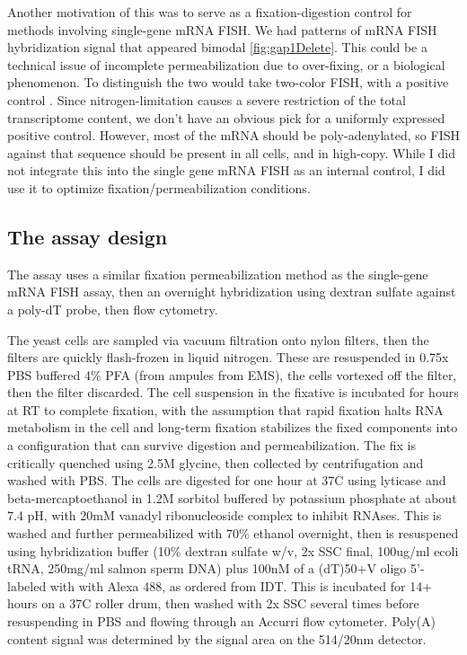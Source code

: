 Another motivation of this was to serve as a fixation-digestion
control for methods involving single-gene mRNA FISH.
We had patterns of mRNA FISH hybridization signal that appeared
bimodal \autoref{fig:gap1Delete}. 
This could be a technical issue of incomplete permeabilization due to
over-fixing, or a biological phenomenon.
To distinguish the two would take two-color FISH, with a positive
control \parencite{andersen2014genetic}.
Since nitrogen-limitation causes a severe restriction of the total
transcriptome content, we don't have an obvious pick for a uniformly
expressed positive control. 
However, most of the mRNA should be poly-adenylated, so FISH against
that sequence should be present in all cells, and in high-copy.
While I did not integrate this into the single gene mRNA FISH as an
internal control, I did use it to optimize fixation/permeabilization 
conditions.

%
%
%
\subsection{The assay design}
%
%
%

The assay uses a similar fixation permeabilization method as the
single-gene mRNA FISH assay, then an overnight hybridization using
dextran sulfate against a poly-dT probe, then flow cytometry.

The yeast cells are sampled via vacuum filtration onto nylon
filters, then the filters are quickly flash-frozen in liquid nitrogen.
These are resuspended in 0.75x PBS buffered 4\% PFA (from ampules from
EMS), the cells vortexed off the filter, then the filter discarded.
The cell suspension in the fixative is incubated for hours at RT to
complete fixation, with the assumption that rapid fixation halts
RNA metabolism in the cell and long-term fixation stabilizes the fixed
components into a configuration that can survive digestion and 
permeabilization. The fix is critically quenched using 2.5M glycine,
then collected by centrifugation and washed with PBS. The cells are
digested for one hour at 37C using lyticase and beta-mercaptoethanol
in 1.2M sorbitol buffered
by potassium phosphate at about 7.4 pH, with 20mM vanadyl
ribonucleoside complex to inhibit RNAses. 
This is washed and further permeabilized with 70\% ethanol overnight,
then is resuspened using hybridization buffer
(10\% dextran sulfate w/v, 2x SSC final, 100ug/ml ecoli tRNA, 
250mg/ml salmon sperm DNA) plus 100nM of a (dT)50+V oligo 5'-labeled
with with Alexa 488, as ordered from IDT. 
This is incubated for 14+ hours on a 37C roller drum, then washed with
2x SSC several times before resuspending in PBS and flowing through an
Accurri flow cytometer.
Poly(A) content signal was determined by the signal area on the
514/20nm detector.

